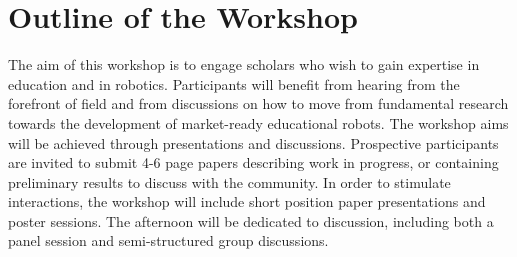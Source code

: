 \documentclass{sig-alternate-05-2015}
\begin{document}
\section{Outline of the Workshop}
The aim of this workshop is to engage scholars who wish to gain expertise in 
education and in robotics. Participants will benefit from hearing from the 
forefront of field and from discussions on how to move from fundamental research 
towards the development of market-ready educational robots.
%
The workshop aims will be achieved through presentations and discussions. 
Prospective participants are invited to submit 4-6 page papers describing work in progress, or containing preliminary results to discuss with the community.
In order to stimulate interactions, the workshop will include short position paper presentations and poster sessions. 
The afternoon will be dedicated to discussion, including both a panel session and semi-structured group discussions.
\end{document}
